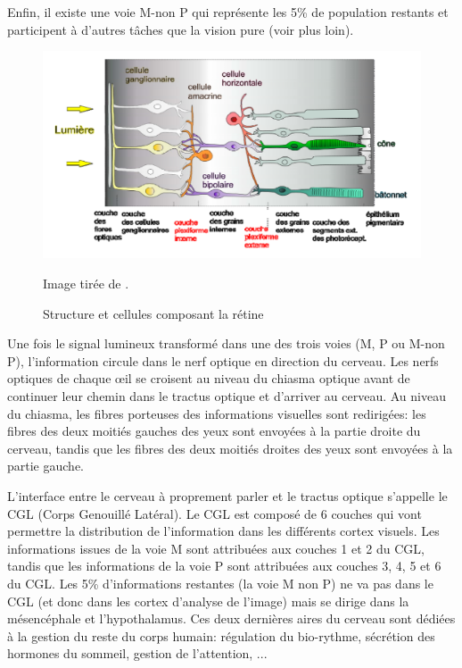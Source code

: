 	\par Enfin, il existe une voie M-non P qui représente les 5\% de population restants et participent à d'autres tâches que la vision pure (voir plus loin). 
	
	\begin{figure}
		\centering
		\includegraphics[scale=.45]{Figures/StructureRetinae}
		\caption{Structure et cellules composant la rétine}{Image tirée de  \citep{anses_effets_2014}.}
		\label{fig:structure_retine}
	\end{figure}
	
	\par Une fois le signal lumineux transformé dans une des trois voies (M, P ou M-non P), l'information circule dans le nerf optique en direction du cerveau. Les nerfs optiques de chaque œil se croisent au niveau du chiasma optique avant de continuer leur chemin dans le tractus optique et d'arriver au cerveau. Au niveau du chiasma, les fibres porteuses des informations visuelles sont redirigées: les fibres des deux moitiés gauches des yeux sont envoyées à la partie droite du cerveau, tandis que les fibres des deux moitiés droites des yeux sont envoyées à la partie gauche.
	
	\par L'interface entre le cerveau à proprement parler et le tractus optique s'appelle le CGL (Corps Genouillé Latéral). Le CGL est composé de 6 couches qui vont permettre la distribution de l'information dans les différents cortex visuels. Les informations issues de la voie M sont attribuées aux couches 1 et 2 du CGL, tandis que les informations de la voie P sont attribuées aux couches 3, 4, 5 et 6 du CGL. Les 5\% d'informations restantes (la voie M non P) ne va pas dans le CGL (et donc dans les cortex d'analyse de l'image) mais se dirige dans la mésencéphale et l'hypothalamus. Ces deux dernières aires du cerveau sont dédiées à la gestion du reste du corps humain: régulation du bio-rythme, sécrétion des hormones du sommeil, gestion de l'attention, ...
	
